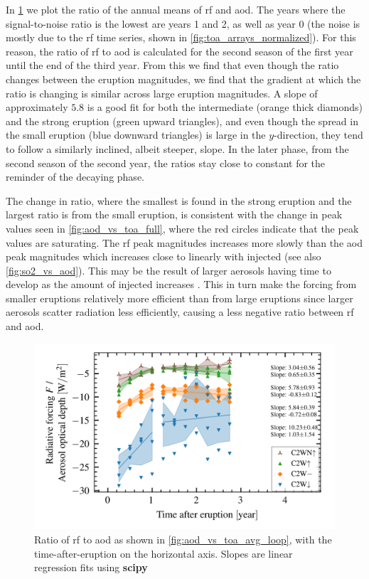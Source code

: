 \documentclass{ametsocV5}
\begin{document}
In \cref{fig:aod_vs_toa_avg_loop_ratio} we plot the ratio of the annual means of \ac{rf}
and \ac{aod}. The years where the signal-to-noise ratio is the lowest are years 1 and 2,
as well as year 0 (the noise is mostly due to the \ac{rf} time series, shown in
\cref{fig:toa_arrays_normalized}). For this reason, the ratio of \ac{rf} to \ac{aod} is
calculated for the second season of the first year until the end of the third year. From
this we find that even though the ratio changes between the eruption magnitudes, we find
that the gradient at which the ratio is changing is similar across large eruption
magnitudes. A slope of approximately \( 5.8 \) is a good fit for both the intermediate
(orange thick diamonds) and the strong eruption (green upward triangles), and even
though the spread in the small eruption (blue downward triangles) is large in the \( y
\)-direction, they tend to follow a similarly inclined, albeit steeper, slope. In the
later phase, from the second season of the second year, the ratios stay close to
constant for the reminder of the decaying phase.

The change in ratio, where the smallest is found in the strong eruption and the largest
ratio is from the small eruption, is consistent with the change in peak values seen in
\cref{fig:aod_vs_toa_full}, where the red circles indicate that the peak values are
saturating. The \ac{rf} peak magnitudes increases more slowly than the \ac{aod} peak
magnitudes which increases close to linearly with injected  (see also
\cref{fig:so2_vs_aod}). This may be the result of larger aerosols having time to develop
as the amount of injected  increases \citep{niemeier2015,marshall2019}. This in
turn make the forcing from smaller eruptions relatively more efficient than from large
eruptions since larger aerosols scatter radiation less efficiently, causing a less
negative ratio between \ac{rf} and \ac{aod}.

\begin{figure}[t]
  \begin{center}
    \includegraphics[width=0.95\linewidth]{figures/aod_vs_toa_avg_loop_ratio.png}
  \end{center}
  \caption{
    Ratio of \ac{rf} to \ac{aod} as shown in
    \cref{fig:aod_vs_toa_avg_loop}, with the time-after-eruption on the horizontal axis.
    Slopes are linear regression fits using \textbf{scipy}
  }%
  \label{fig:aod_vs_toa_avg_loop_ratio}
\end{figure}
\end{document}
